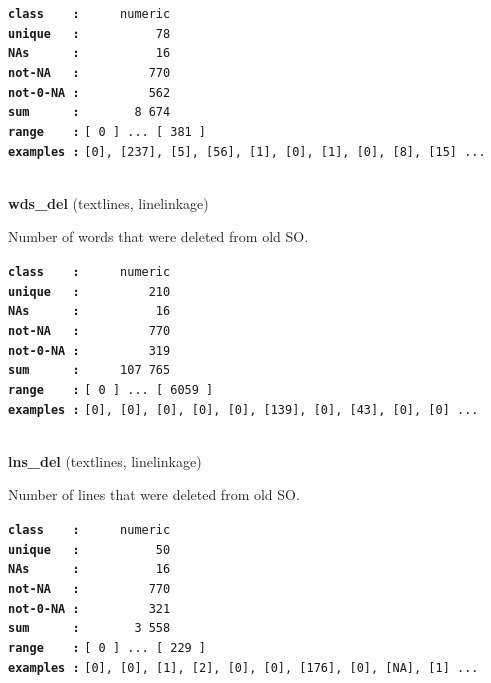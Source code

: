 \documentclass[]{article}
\begin{document}
\textbf{\texttt{class\ \ \ \ :}} \texttt{~~~~~numeric}\\
\textbf{\texttt{unique\ \ \ :}} \texttt{~~~~~~~~~~78}\\
\textbf{\texttt{NAs\ \ \ \ \ \ :}} \texttt{~~~~~~~~~~16}\\
\textbf{\texttt{not-NA\ \ \ :}} \texttt{~~~~~~~~~770}\\
\textbf{\texttt{not-0-NA\ :}} \texttt{~~~~~~~~~562}\\
\textbf{\texttt{sum\ \ \ \ \ \ :}} \texttt{~~~~~~~8~674}\\
\textbf{\texttt{range\ \ \ \ :}}
\texttt{{[}\ 0\ {]}\ ...\ {[}\ 381\ {]}}\\
\textbf{\texttt{examples\ :}}
\texttt{{[}0{]},\ {[}237{]},\ {[}5{]},\ {[}56{]},\ {[}1{]},\ {[}0{]},\ {[}1{]},\ {[}0{]},\ {[}8{]},\ {[}15{]}\ ...}\\

~

\textbf{wds\_del} (textlines, linelinkage)

Number of words that were deleted from old SO.

\textbf{\texttt{class\ \ \ \ :}} \texttt{~~~~~numeric}\\
\textbf{\texttt{unique\ \ \ :}} \texttt{~~~~~~~~~210}\\
\textbf{\texttt{NAs\ \ \ \ \ \ :}} \texttt{~~~~~~~~~~16}\\
\textbf{\texttt{not-NA\ \ \ :}} \texttt{~~~~~~~~~770}\\
\textbf{\texttt{not-0-NA\ :}} \texttt{~~~~~~~~~319}\\
\textbf{\texttt{sum\ \ \ \ \ \ :}} \texttt{~~~~~107~765}\\
\textbf{\texttt{range\ \ \ \ :}}
\texttt{{[}\ 0\ {]}\ ...\ {[}\ 6059\ {]}}\\
\textbf{\texttt{examples\ :}}
\texttt{{[}0{]},\ {[}0{]},\ {[}0{]},\ {[}0{]},\ {[}0{]},\ {[}139{]},\ {[}0{]},\ {[}43{]},\ {[}0{]},\ {[}0{]}\ ...}\\

~

\textbf{lns\_del} (textlines, linelinkage)

Number of lines that were deleted from old SO.

\textbf{\texttt{class\ \ \ \ :}} \texttt{~~~~~numeric}\\
\textbf{\texttt{unique\ \ \ :}} \texttt{~~~~~~~~~~50}\\
\textbf{\texttt{NAs\ \ \ \ \ \ :}} \texttt{~~~~~~~~~~16}\\
\textbf{\texttt{not-NA\ \ \ :}} \texttt{~~~~~~~~~770}\\
\textbf{\texttt{not-0-NA\ :}} \texttt{~~~~~~~~~321}\\
\textbf{\texttt{sum\ \ \ \ \ \ :}} \texttt{~~~~~~~3~558}\\
\textbf{\texttt{range\ \ \ \ :}}
\texttt{{[}\ 0\ {]}\ ...\ {[}\ 229\ {]}}\\
\textbf{\texttt{examples\ :}}
\texttt{{[}0{]},\ {[}0{]},\ {[}1{]},\ {[}2{]},\ {[}0{]},\ {[}0{]},\ {[}176{]},\ {[}0{]},\ {[}NA{]},\ {[}1{]}\ ...}\\
\end{document}
